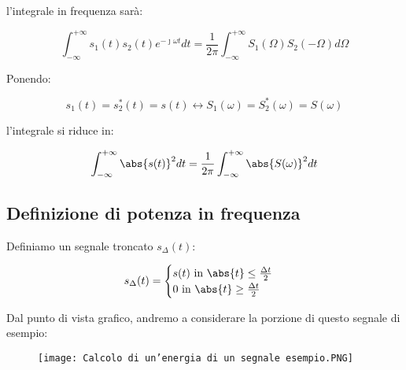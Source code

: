 l'integrale in frequenza sarà: 

{
    \Large 
    \begin{equation}
        \int_{- \infty}^{+ \infty} 
        s_1 (t) s_2 (t) e^{-\jmath \omega t} dt 
        = 
        \frac{1}{2 \pi} 
        \int_{- \infty}^{+ \infty}       
        S_1 (\Omega) S_2 (- \Omega) d\Omega
    \end{equation}
}

Ponendo: 

{
    \Large 
    \begin{equation}
        s_1 (t) = s_2 ^{*}(t) = s(t)
        \leftrightarrow 
        S_1 (\omega) = S_2 ^{*} (\omega) = S(\omega)
    \end{equation}
}

l'integrale si riduce in: 

{
    \Large 
    \begin{equation}
            \int_{- \infty}^{+\infty} 
            \abs{s(t)} ^{2} dt 
            \\
            = 
            \frac{1}{2 \pi} 
            \int_{- \infty}^{+\infty} 
            \abs{S(\omega)} ^{2} dt 
    \end{equation}
} 

\newpage 

\subsection{Definizione di potenza in frequenza}

Definiamo un segnale troncato $s_\Delta (t)$: 

{
    \Large 
    \begin{equation}
        s_\Delta (t) 
        = 
        \begin{cases}
            s(t) 
            \text{ in } 
            \abs{t} \leq \frac{\Delta t}{2} 
            \\ 
            0 
            \text{ in } 
            \abs{t} \ge \frac{\Delta t}{2}
        \end{cases} 
    \end{equation}
}

Dal punto di vista grafico, andremo a considerare la porzione di questo segnale di esempio: 

\begin{figure}[h]
    \centering
    \texttt{[image: Calcolo di un'energia di un segnale esempio.PNG]}
\end{figure}  


